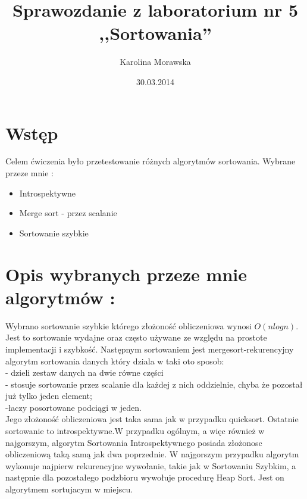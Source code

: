 \documentclass[11pt]{article}
\begin{document}
 \begin{titlepage} 
\title{ Sprawozdanie z laboratorium nr 5 \\ ,,Sortowania''} 
\author{Karolina Morawska}
 \date{30.03.2014}
 \maketitle 
\end{titlepage}



\section{Wstęp}

Celem ćwiczenia było przetestowanie różnych algorytmów sortowania. Wybrane przeze mnie :

  \begin{itemize}
    \item Introspektywne
  \item Merge sort - przez scalanie
    \item Sortowanie szybkie

  \end{itemize}
  
\section{Opis wybranych przeze mnie algorytmów :}
 Wybrano sortowanie szybkie którego złożoność obliczeniowa wynosi $O(n log n)$.\\Jest to sortowanie wydajne oraz często używane ze względu na prostote implementacji i szybkość. 
Następnym sortowaniem  jest mergesort-rekurencyjny algorytm sortowania danych który dziala w taki oto  sposob:
   \\- dzieli zestaw danych na dwie równe części
  \\-  stosuje sortowanie przez scalanie dla każdej z nich oddzielnie, chyba że pozostał już tylko jeden element;
   \\ -łaczy posortowane podciągi w jeden.
\\Jego złożoność  obliczeniowa jest taka sama jak w przypadku quicksort.
Ostatnie sortowanie to introspektywne.W przypadku ogólnym, a więc  również w najgorszym, algorytm Sortowania Introspektywnego posiada złożonosc obliczeniową taką samą jak dwa  poprzednie.
W najgorszym przypadku algorytm wykonuje najpierw rekurencyjne wywołanie, takie jak w Sortowaniu Szybkim, a następnie dla pozostałego podzbioru wywołuje procedurę Heap Sort. Jest on algorytmem sortujacym w miejscu.
\newpage
\end{document}
